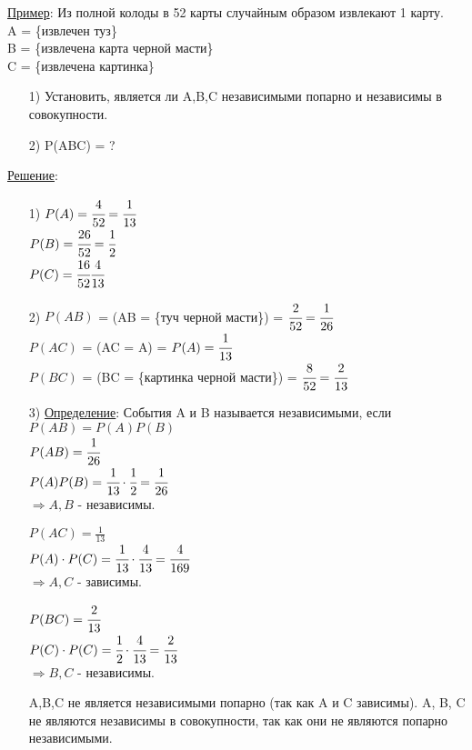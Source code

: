 
\underline{Пример}: Из полной колоды в 52 карты случайным образом извлекают 1 карту. \\
A = \{извлечен туз\} \\
B = \{извлечена карта черной масти\} \\
C = \{извлечена картинка\} \\
\begin{enumerate}
\item[1)] Установить, является ли A,B,C независимыми попарно и независимы в совокупности. \\

\item[2)] P(ABC) = ? \\
\end{enumerate}
\underline{Решение}:
\begin{enumerate}
\item[1)] $P(A) = \cfrac{4}{52} = \cfrac{1}{13}$ \\
$P(B) = \cfrac{26}{52} = \cfrac{1}{2}$ \\
$P(C) = \cfrac{16}{52} \cfrac{4}{13}$ \\

\item[2)] $P(AB)$ = (AB = \{туч черной масти\}) = $\cfrac{2}{52} = \cfrac{1}{26}$ \\
$P(AC)$ = (AC = A) = $P(A) = \cfrac{1}{13}$ \\
$P(BC)$ = (BC = \{картинка черной масти\}) = $\cfrac{8}{52} = \cfrac{2}{13}$

\item[3)] \underline{Определение}: События A и B называется независимыми, если $P(AB) = P(A)P(B)$ \\
$P(AB) = \cfrac{1}{26}$ \\
$P(A)P(B) = \cfrac{1}{13} \cdot \cfrac{1}{2} = \cfrac{1}{26}$ \\
$\Rightarrow A,B$ - независимы.

$P(AC) =\frac{1}{13}$ \\
$P(A) \cdot P(C) = \cfrac{1}{13} \cdot \cfrac{4}{13} = \cfrac{4}{169}$ \\
$\Rightarrow A,C$ - зависимы.

$P(BC) = \cfrac{2}{13}$ \\
$P(C) \cdot P(C) = \cfrac{1}{2} \cdot \cfrac{4}{13} = \cfrac{2}{13}$ \\
$\Rightarrow B,C$ - независимы.

A,B,C не является независимыми попарно (так как A и C зависимы). A, B, C не являются независимы в совокупности, так как они не являются попарно независимыми.
\end{enumerate}


